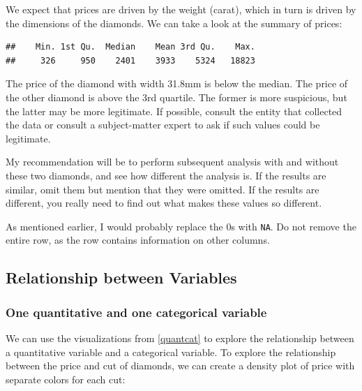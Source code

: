 \documentclass[
]{book}
\newenvironment{Shaded}{\begin{snugshade}}{\end{snugshade}}
\newcommand{\FunctionTok}[1]{\textcolor[rgb]{0.13,0.29,0.53}{\textbf{#1}}}
\newcommand{\NormalTok}[1]{#1}
\newcommand{\SpecialCharTok}[1]{\textcolor[rgb]{0.81,0.36,0.00}{\textbf{#1}}}
\theoremstyle{definition}
\theoremstyle{definition}
\theoremstyle{definition}
\theoremstyle{definition}
\theoremstyle{remark}
\begin{document}
We expect that prices are driven by the weight (carat), which in turn is driven by the dimensions of the diamonds. We can take a look at the summary of prices:

\begin{Shaded}
\end{Shaded}

\begin{verbatim}
##    Min. 1st Qu.  Median    Mean 3rd Qu.    Max. 
##     326     950    2401    3933    5324   18823
\end{verbatim}

The price of the diamond with width 31.8mm is below the median. The price of the other diamond is above the 3rd quartile. The former is more suspicious, but the latter may be more legitimate. If possible, consult the entity that collected the data or consult a subject-matter expert to ask if such values could be legitimate.

My recommendation will be to perform subsequent analysis with and without these two diamonds, and see how different the analysis is. If the results are similar, omit them but mention that they were omitted. If the results are different, you really need to find out what makes these values so different.

As mentioned earlier, I would probably replace the 0s with \texttt{NA}. Do not remove the entire row, as the row contains information on other columns.

\hypertarget{relationship-between-variables}{%
\subsection{Relationship between Variables}\label{relationship-between-variables}}

\hypertarget{one-quantitative-and-one-categorical-variable}{%
\subsubsection{One quantitative and one categorical variable}\label{one-quantitative-and-one-categorical-variable}}

We can use the visualizations from \ref{quantcat} to explore the relationship between a quantitative variable and a categorical variable. To explore the relationship between the price and cut of diamonds, we can create a density plot of price with separate colors for each cut:
\end{document}
